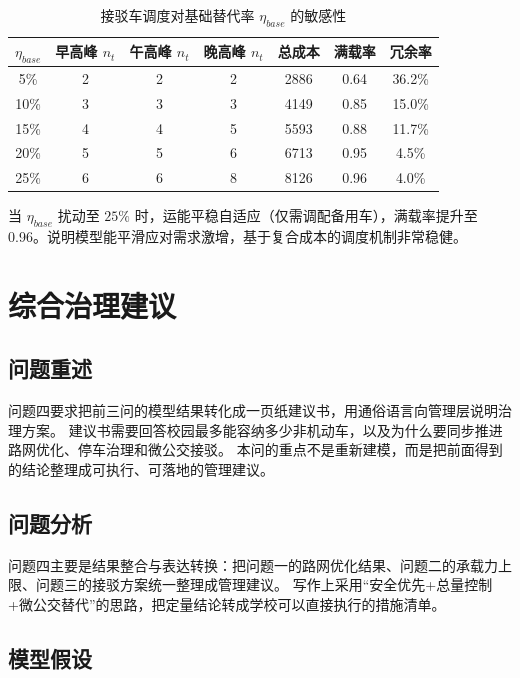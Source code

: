 \documentclass[UTF8,zihao=-4,a4paper]{ctexart}
\numberwithin{table}{section}
\numberwithin{figure}{section}
\numberwithin{equation}{section}
\begin{document}
\begin{table}[H]
\footnotesize
\centering
\caption{接驳车调度对基础替代率 $\eta_{base}$ 的敏感性}
\label{tab:sensitivity}
\begin{tabular}{ccccccc}
\toprule
$\eta_{base}$ & \textbf{早高峰 $n_t$} & \textbf{午高峰 $n_t$} & \textbf{晚高峰 $n_t$} & \textbf{总成本} & \textbf{满载率} & \textbf{冗余率} \\
\midrule
5\%  & 2 & 2 & 2 & 2886 & 0.64 & 36.2\% \\
10\% & 3 & 3 & 3 & 4149 & 0.85 & 15.0\% \\
15\% & 4 & 4 & 5 & 5593 & 0.88 & 11.7\% \\
20\% & 5 & 5 & 6 & 6713 & 0.95 & 4.5\% \\
25\% & 6 & 6 & 8 & 8126 & 0.96 & 4.0\% \\
\bottomrule
\end{tabular}
\end{table}

当 $\eta_{base}$ 扰动至 $25\%$ 时，运能平稳自适应（仅需调配备用车），满载率提升至0.96。说明模型能平滑应对需求激增，基于复合成本的调度机制非常稳健。

\newpage

\section{综合治理建议}

\subsection{问题重述}

问题四要求把前三问的模型结果转化成一页纸建议书，用通俗语言向管理层说明治理方案。
建议书需要回答校园最多能容纳多少非机动车，以及为什么要同步推进路网优化、停车治理和微公交接驳。
本问的重点不是重新建模，而是把前面得到的结论整理成可执行、可落地的管理建议。

\subsection{问题分析}

问题四主要是结果整合与表达转换：把问题一的路网优化结果、问题二的承载力上限、问题三的接驳方案统一整理成管理建议。
写作上采用“安全优先+总量控制+微公交替代”的思路，把定量结论转成学校可以直接执行的措施清单。

\subsection{模型假设}
\end{document}

